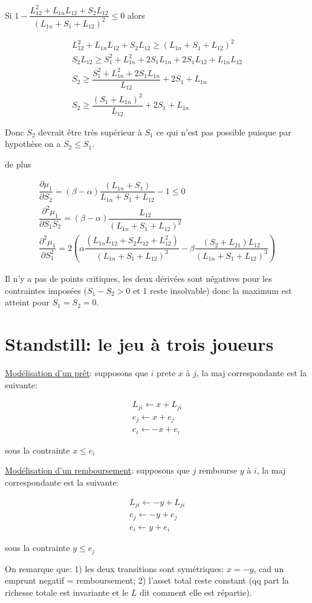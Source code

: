 \documentclass{article}
\def\AR#1{
\[
\begin{array}{llllllll}
#1
\end{array}
\]
}
\begin{document}
Si 
$1 - \dfrac{L_{12}^2 + L_{1n}L_{12} + S_{2}L_{12}}{(L_{1n}+S_{1}+L_{12})^2} \leq 0$ alors 
\AR{
L_{12}^2 + L_{1n}L_{12} + S_{2}L_{12}
\geq
(L_{1n}+S_{1}+L_{12})^2
\\
S_{2}L_{12} 
\geq
S_{1}^2 + L_{1n}^2 + 2S_{1}L_{1n} + 2S_{1}L_{12} + L_{1n}L_{12}
\\
S_{2} 
\geq
\dfrac{S_{1}^2 + L_{1n}^2 + 2S_{1}L_{1n}}
{L_{12}}
+
2S_{1} + L_{1n}
\\
S_{2} 
\geq
\dfrac{(S_{1} + L_{1n})^2}
{L_{12}}
+
2S_{1} + L_{1n}
}
Donc $S_{2}$ devrait être très supérieur à $S_{1}$ ce qui n'est pas possible puisque par hypothèse on a $S_{2} \leq S_{1}$.

de plus
\AR{
\dfrac
{\partial \mu_1}
{\partial S_{2}} =
(\beta - \alpha)
\dfrac
{(L_{1n}+S_{1})}
{L_{1n}+S_{1}+L_{12}}
- 1 
\leq 
0
\\
\dfrac
{\partial^2 \mu_1}
{\partial S_{1}S_{2}} =
(\beta - \alpha)
\dfrac
{L_{12}}
{(L_{1n}+S_{1}+L_{12})^2}
\\
\dfrac
{\partial^2 \mu_1}
{\partial S_{1}^2} =
2(
\alpha 
\dfrac
{(L_{1n}L_{12}+S_{2}L_{12}+ L_{12}^2)}
{(L_{1n}+S_{1}+L_{12})^3}
-
\beta
\dfrac
{(S_{2}+L_{21})L_{12}}
{(L_{1n}+S_{1}+L_{12})^3})
}


Il n'y a pas de points critiques, les deux dérivées sont négatives pour les contraintes imposées ($S_{1} - S_{2} > 0$ et 1 reste insolvable)  donc la maximum est atteint pour $S_{1}=S_{2}=0$.

\section{Standstill: le jeu à trois joueurs}\label{stand}
\underline{Modélisation d'un prêt}: supposons que $i$ prete $x$ à $j$,
la maj correspondante est la suivante:
\AR{
L_{ji} \leftarrow x + L_{ji}
\\
e_{j} \leftarrow x + e_{j}
\\
e_{i} \leftarrow -x + e_{i}
}
sous la contrainte $x\leq e_i$

\underline{Modélisation d'un remboursement}: supposons que $j$ rembourse $y$ à $i$,
la maj correspondante est la suivante:
\AR{
L_{ji} \leftarrow -y + L_{ji}
\\
e_{j} \leftarrow -y + e_{j}
\\
e_{i} \leftarrow y + e_{i}
}
sous la contrainte $y\leq e_j$

On remarque que: 
1) les deux transitions sont symétriques: $x=-y$,
cad un emprunt negatif = remboursement;
2) l'asset total reste constant (qq part la richesse totale est invariante
et le $L$ dit comment elle est répartie).
\end{document}
